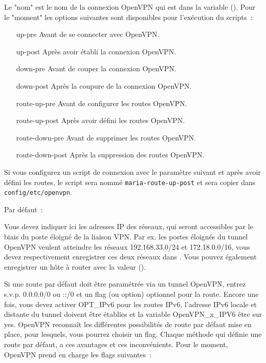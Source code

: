\begin{description}
  Le "nom" est le nom de la connexion OpenVPN qui est dans la variable
  (). Pour le "moment" les options suivantes sont
  disponibles pour l'exécution du scripts~:

  \begin{itemize}
    \item [up-pre] Avant de se connecter avec OpenVPN.
    \item [up-post] Après avoir établi la connexion OpenVPN.
    \item [down-pre] Avant de couper la connexion OpenVPN.
    \item [down-post] Après la coupure de la connexion OpenVPN.
    \item [route-up-pre] Avant de configurer les routes OpenVPN.
    \item [route-up-post] Après avoir défini les routes OpenVPN.
    \item [route-down-pre] Avant de supprimer les routes OpenVPN.
    \item [route-down-post] Après la suppression des routes OpenVPN.
  \end{itemize}

  Si vous configurez un script de connexion avec le paramètre suivant
   et après avoir défini les routes, le script
  sera nommé \texttt{maria-route-up-post} et sera copier dans \texttt{config/etc/openvpn}.


  Par défaut~: 

  Vous devez indiquer ici les adresses IP des réseaux, qui seront accessibles
  par le biais du poste éloigné de la liaison VPN. Par ex. les postes éloignés
  du tunnel OpenVPN veulent atteindre les réseaux 192.168.33.0/24 et
  172.18.0.0/16, vous devez respectivement enregistrer ces deux réseaux dans
  . Vous pouvez également enregistrer un hôte à router
  avec la valeur ().

  Si une route par défaut doit être paramétrée via un tunnel OpenVPN, entrez 
  s.v.p. 0.0.0.0/0 ou ::/0 et un flag (ou option) optionnel pour la route. Encore
  une fois, vous devez activer OPT\_IPv6 pour les routes IPv6, l'adresse IPv6
  locale et distante du tunnel doivent être établies et la variable
  OpenVPN\_x\_IPV6 être sur yes. OpenVPN reconnaît les différentes possibilités
  de route par défaut mise en place, pour lesquels, vous pourrez choisir un flag.
  Chaque méthode qui définie une route par défaut, a ces avantages et ces
  inconvénients. Pour le moment, OpenVPN prend en charge les flags suivantes~:


\end{description}
